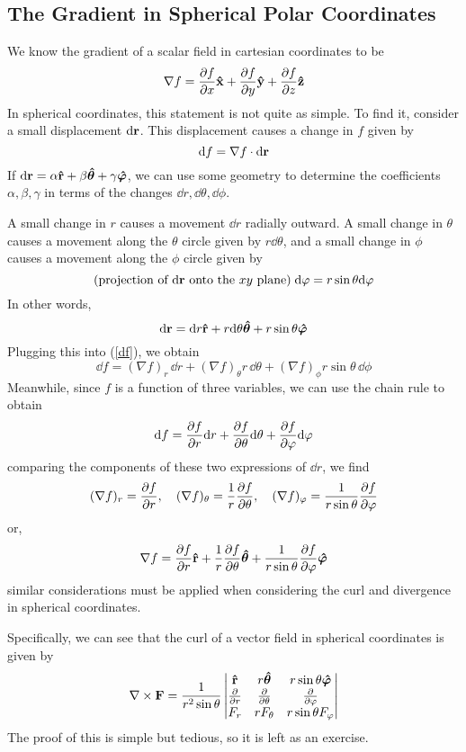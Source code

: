 \subsection*{The Gradient in Spherical Polar Coordinates}
We know the gradient of a scalar field in cartesian coordinates to be 
\[ \nabla f = \pdv{f}{x}\mathbf{\hat{x}} + \pdv{f}{y}\mathbf{\hat{y}} + \pdv{f}{z}\mathbf{\hat{z}} \]
In spherical coordinates, this statement is not quite as simple. To find it, consider a small displacement $\dd \mathbf{r}$. This displacement causes a change in $f$ given by
\begin{equation} \label{df}
    \dd f = \nabla f \cdot \dd \mathbf{r}
\end{equation}
If $\dd \mathbf{r} = \alpha \mathbf{\hat{r}} +  \beta \bm{\hat{\theta}} + \gamma \bm{\hat{\varphi}}$, we can use some geometry to determine the coefficients $\alpha, \beta,\gamma$ in terms of the changes $\dd r, \dd \theta, \dd \phi$. 

A small change in $r$ causes a movement $\dd r$ radially outward. A small change in $\theta$ causes a movement along the $\theta$ circle given by $r\dd \theta$, and a small change in $\phi$ causes a movement along the $\phi$ circle given by
\[ (\text{projection of $\dd \mathbf{r}$ onto the $xy$ plane})\; \dd \varphi = r\sin\theta \dd \varphi \]
In other words,
\[ \dd \mathbf{r} = \dd r \mathbf{\hat{r}} + r\dd \theta \bm{\hat\theta} + r\sin\theta \bm{\hat{\varphi}} \]
Plugging this into (\ref{df}), we obtain
\[ \dd f = (\nabla f)_r\,  \dd r + (\nabla f)_\theta r\, \dd \theta + (\nabla f)_\phi r\sin\theta \, \dd \phi \]
Meanwhile, since $f$ is a function of three variables, we can use the chain rule to obtain
\[ \dd f = \pdv{f}{r}\dd r + \pdv{f}{\theta}\dd\theta + \pdv{f}{\varphi}\dd\varphi \]
comparing the components of these two expressions of $\dd r$, we find
\[ (\nabla f)_r = \pdv{f}{r}, \quad (\nabla f)_\theta = \frac{1}{r}\pdv{f}{\theta}, \quad (\nabla f)_\varphi = \frac{1}{r\sin\theta}\pdv{f}{\varphi}  \]
or,
\[ \nabla f = \pdv{f}{r}\mathbf{\hat{r}} + \frac{1}{r}\pdv{f}{\theta} \bm{\hat\theta} + \frac{1}{r\sin\theta}\pdv{f}{\varphi} \bm{\hat{\varphi}} \]
similar considerations must be applied when considering the curl and divergence in spherical coordinates. 

Specifically, we can see that the curl of a vector field in spherical coordinates is given by
\[ \nabla \times \mathbf{F} = \frac{1}{r^2\sin\theta}\begin{vmatrix}
    \mathbf{\hat{r}} & r\bm{\hat\theta} & r\sin\theta \bm{\hat{\varphi}} \\
    \pdv{r} & \pdv{\theta} & \pdv{\varphi} \\
    F_r & rF_\theta & r\sin\theta F_\varphi
\end{vmatrix} \]
The proof of this is simple but tedious, so it is left as an exercise. 
